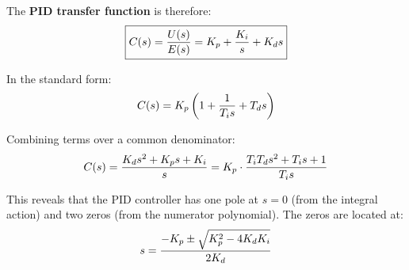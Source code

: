 The \textbf{PID transfer function} is therefore:
\begin{equation}
\boxed{C(s) = \frac{U(s)}{E(s)} = K_p + \frac{K_i}{s} + K_d s}
\label{eq:pid_tf_parallel}
\end{equation}

In the standard form:
\begin{equation}
C(s) = K_p \left( 1 + \frac{1}{T_i s} + T_d s \right)
\label{eq:pid_tf_standard}
\end{equation}

Combining terms over a common denominator:
\begin{equation}
C(s) = \frac{K_d s^2 + K_p s + K_i}{s} = K_p \cdot \frac{T_i T_d s^2 + T_i s + 1}{T_i s}
\label{eq:pid_tf_combined}
\end{equation}

This reveals that the PID controller has one pole at $s = 0$ (from the integral action) and two zeros (from the numerator polynomial). The zeros are located at:
\begin{equation}
s = \frac{-K_p \pm \sqrt{K_p^2 - 4K_dK_i}}{2K_d}
\end{equation}

